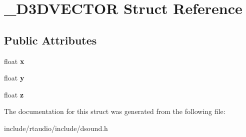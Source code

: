 \hypertarget{struct___d3_d_v_e_c_t_o_r}{}\section{\+\_\+\+D3\+D\+V\+E\+C\+T\+OR Struct Reference}
\label{struct___d3_d_v_e_c_t_o_r}
\subsection*{Public Attributes}
\begin{DoxyCompactItemize}
\item 
float {\bfseries x}\hypertarget{struct___d3_d_v_e_c_t_o_r_a927e1164122030a3dccd4f69fc1127f0}{}\label{struct___d3_d_v_e_c_t_o_r_a927e1164122030a3dccd4f69fc1127f0}

\item 
float {\bfseries y}\hypertarget{struct___d3_d_v_e_c_t_o_r_abd365f8fd246cb0a51e240c2d3dbcd21}{}\label{struct___d3_d_v_e_c_t_o_r_abd365f8fd246cb0a51e240c2d3dbcd21}

\item 
float {\bfseries z}\hypertarget{struct___d3_d_v_e_c_t_o_r_adda9ba325854ea6e0aec6d829a4342e2}{}\label{struct___d3_d_v_e_c_t_o_r_adda9ba325854ea6e0aec6d829a4342e2}

\end{DoxyCompactItemize}


The documentation for this struct was generated from the following file\+:\begin{DoxyCompactItemize}
\item 
include/rtaudio/include/dsound.\+h\end{DoxyCompactItemize}
